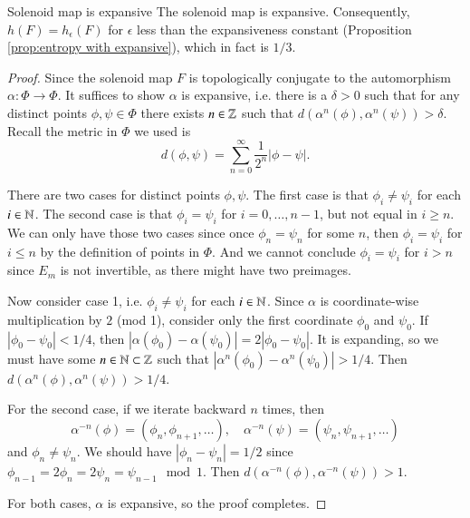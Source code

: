 \documentclass[12pt,a4paper]{article}
\begin{document}
		
		
		
		
		\begin{proposition}{Solenoid map is expansive}{}
			The solenoid map is expansive. Consequently, $h(F)=h_{\epsilon}(F)$ for $\epsilon$ less than the expansiveness constant (Proposition \ref{prop:entropy with expansive}), which in fact is $1/3$.
		\end{proposition}
		
		\begin{proof}
			\cite{williams1955note}
			Since the solenoid map $F$ is topologically conjugate to the automorphism $\alpha:\Phi\rightarrow \Phi$. It suffices to show $\alpha$ is expansive, i.e. there is a $\delta>0$ such that for any distinct points $\phi,\psi\in \Phi$ there exists $n\in\mathbb{Z}$ such that $d(\alpha^n(\phi),\alpha^n(\psi))>\delta$. Recall the metric in $\Phi$ we used is
			$$
			d(\phi,\psi)=\sum_{n=0}^{\infty}\frac{1}{2^n}|\phi-\psi|.
			$$
			
			There are two cases for distinct points $\phi,\psi$. The first case is that $\phi_i\neq \psi_i$ for each $i\in \mathbb{N}$. The second case is that $\phi_i=\psi_i$ for $i=0,\dots,n-1$, but not equal in $i\geq n$. We can only have those two cases since once $\phi_n=\psi_n$ for some $n$, then $\phi_i=\psi_i$ for $i\leq n$ by the definition of points in $\Phi$. And we cannot conclude $\phi_i=\psi_i$ for $i> n$ since $E_m$ is not invertible, as there might have two preimages.
			
			Now consider case 1, i.e. $\phi_i\neq \psi_i$ for each $i\in\mathbb{N}$. Since $\alpha$ is coordinate-wise multiplication by $2$ (mod 1), consider only the first coordinate $\phi_0$ and $\psi_0$. If $|\phi_0-\psi_0|<1/4$, then $|\alpha(\phi_0)-\alpha(\psi_0)|=2|\phi_0-\psi_0|$. It is expanding, so we must have some $n\in\mathbb{N}\subset\mathbb{Z}$ such that $|\alpha^n(\phi_0)-\alpha^n(\psi_0)|>1/4$. Then $d(\alpha^n(\phi),\alpha^n(\psi))>1/4$.
			
			For the second case, if we iterate backward $n$ times, then 
			$$
			\alpha^{-n}(\phi)=(\phi_n,\phi_{n+1},\dots),\quad \alpha^{-n}(\psi)=(\psi_n,\psi_{n+1},\dots)
			$$
			and $\phi_n\neq \psi_n$. We should have $|\phi_n-\psi_n|=1/2$ since $\phi_{n-1}=2\phi_n=2\psi_n=\psi_{n-1}\mod 1$. Then
			$d(\alpha^{-n}(\phi),\alpha^{-n}(\psi))>1$.
			
			For both cases, $\alpha$ is expansive, so the proof completes.
		\end{proof}
		
		
		
\end{document}
